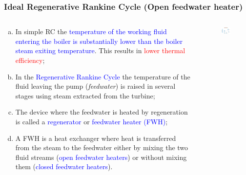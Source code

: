 \documentclass[10pt,compress,handout,ignorenonframetext]{beamer}
\newcommand{\red}{\textcolor{red}}
\newcommand{\blue}{\textcolor{blue}}
\begin{document}
\begin{frame}
 \frametitle{Ideal Regenerative Rankine Cycle (Open feedwater heater)}
  \begin{columns}
    \begin{column}[c]{0.5\linewidth}
      \begin{enumerate}[(a)]\scriptsize
         \item<1-> In simple RC the \blue{temperature of the working fluid entering the boiler is substantially lower than the boiler steam exiting temperature}.  This results in \red{lower thermal efficiency};
         \item<2-> In the \blue{Regenerative Rankine Cycle} the temperature of the fluid leaving the pump ({\it feedwater}) is raised in several stages using steam extracted from the turbine;
         \item<3-> The device where the feedwater is heated by regeneration is called a \blue{regenerator} or \blue{feedwater heater (FWH)};
         \item<4-> A FWH is a heat exchanger where heat is transferred from the steam to the feedwater either by mixing the two fluid streams (\blue{open feedwater heaters}) or without mixing them (\blue{closed feedwater heaters}).
    \end{enumerate} 
   \end{column}
   \begin{column}[c]{0.5\linewidth} 
     \begin{center}
        \begin{figure}
            \includegraphics[width=6.5cm,clip]{./Pics/RegenerativeOpen_RankineCycle}
        \end{figure}
     \end{center}
   \end{column}
  \end{columns}
 \normalsize
\end{frame}
\end{document}
